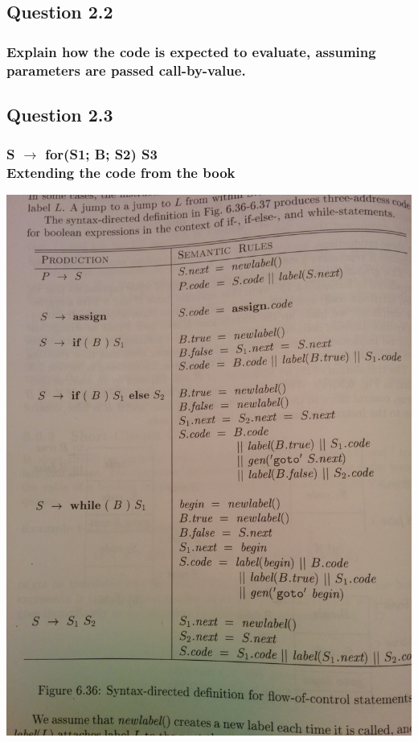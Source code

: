 \documentclass[11pt, oneside]{article}   	%
\begin{document}
\subsection{Question 2.2}
\subsubsection{Explain how the code is expected to evaluate, assuming parameters are passed call-by-value.}

\subsection{Question 2.3}
\subsubsection{S $\rightarrow$ for(S1; B; S2) S3 \\ Extending the code from the book}
\includegraphics[scale=0.15]{IMG_20141029_013718.jpg} \\
\end{document}
